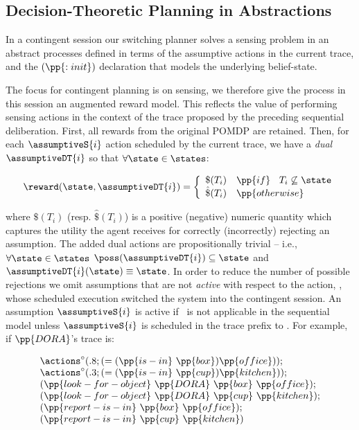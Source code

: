 \subsection{Decision-Theoretic Planning in Abstractions}

In a contingent session our switching planner solves a sensing problem
in an abstract processes defined in terms of the assumptive actions in
the current trace, and the $(\pp{:init})$ declaration that models the
underlying belief-state.

The focus for contingent planning is on sensing, we therefore give the
process in this session an augmented reward model.  This reflects the
value of performing sensing actions in the context of the trace
proposed by the preceding sequential deliberation. First, all rewards
from the original POMDP are retained. Then, for each $\assumptiveS{i}$
action scheduled by the current trace, we have a {\em dual}
$\assumptiveDT{i}$ so that $\forall\state\in\states$:

\[
\reward(\state, \assumptiveDT{i}) = \bigg\{ \begin{array}{ll}
\$(T_i) & \pp{if}~\;\;T_i \not\subseteq \state \\
\hat\$(T_i) & \pp{otherwise} \\
\end{array}
\]

\noindent where $\$(T_i)$ (resp. $\hat\$(T_i)$) is a positive
(negative) numeric quantity which captures the utility the agent
receives for correctly (incorrectly) rejecting an assumption. The
added dual actions are propositionally trivial -- i.e.,
$\forall\state\in\states$ $\poss(\assumptiveDT{i})
\subseteq \state$ and $\assumptiveDT{i}(\state) \equiv \state$.  
In order to reduce the number of possible rejections we omit
assumptions that are not {\em active} with respect to the action,
\switchAction, whose scheduled execution switched the system into
the contingent session. An assumption $\assumptiveS{i}$ is active if
\switchAction\ is not applicable in the sequential model unless
$\assumptiveS{i}$ is scheduled in the trace prefix
to \switchAction. For example, if $\pp{DORA}$'s trace is:

\[
\begin{array}{l}
\actions^{\circ}(.8;(=(\pp{is-in}~\pp{box})\pp{office}));\\
\actions^{\circ}(.3;(=(\pp{is-in}~\pp{cup})\pp{kitchen}));\\
(\pp{look-for-object}~\pp{DORA}~\pp{box}~\pp{office});\\
(\pp{look-for-object}~\pp{DORA}~\pp{cup}~\pp{kitchen});\\
(\pp{report-is-in}~\pp{box}~\pp{office}); \\
(\pp{report-is-in}~\pp{cup}~\pp{kitchen})
\end{array}
\]

